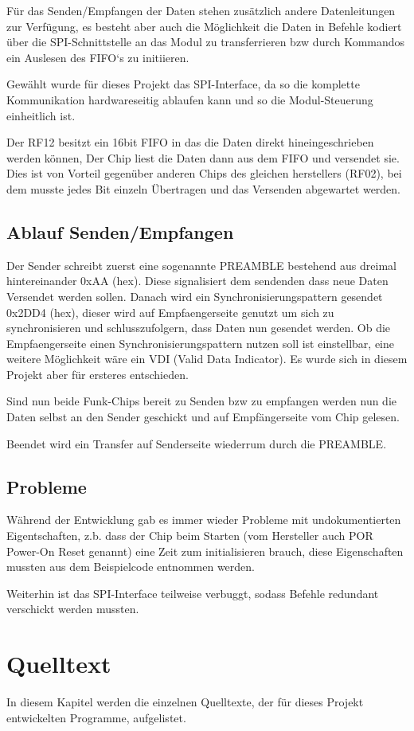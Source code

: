 \documentclass{scrartcl}
\begin{document}
		Für das Senden/Empfangen der Daten stehen zusätzlich andere Datenleitungen
		zur Verfügung, es besteht aber auch die Möglichkeit die Daten in Befehle
		kodiert über die SPI-Schnittstelle an das Modul zu transferrieren bzw
		durch Kommandos ein Auslesen des FIFO`s zu initiieren.

		Gewählt wurde für dieses Projekt das SPI-Interface, da so die komplette 
		Kommunikation hardwareseitig ablaufen kann und so die Modul-Steuerung einheitlich ist.

		Der RF12 besitzt ein 16bit FIFO in das die Daten direkt hineingeschrieben werden können,
		Der Chip liest die Daten dann aus dem FIFO und versendet sie.
		Dies ist von Vorteil gegenüber anderen Chips des gleichen herstellers (RF02), bei dem
		musste jedes Bit einzeln Übertragen und das Versenden abgewartet werden.

	\subsection{Ablauf Senden/Empfangen}
		Der Sender schreibt zuerst eine sogenannte PREAMBLE bestehend aus dreimal 
		hintereinander 0xAA (hex). Diese signalisiert dem sendenden dass neue Daten 
		Versendet werden sollen.
		Danach wird ein Synchronisierungspattern gesendet 0x2DD4 (hex), dieser wird
		auf Empfaengerseite genutzt um sich zu synchronisieren und schlusszufolgern,
		dass Daten nun gesendet werden. Ob die Empfaengerseite einen
		Synchronisierungspattern nutzen soll ist einstellbar, eine weitere Möglichkeit
		wäre ein VDI (Valid Data Indicator). Es wurde sich in diesem Projekt
		aber für ersteres entschieden.

		Sind nun beide Funk-Chips bereit zu Senden bzw zu empfangen werden nun die Daten
		selbst an den Sender geschickt und auf Empfängerseite vom Chip gelesen.

		Beendet wird ein Transfer auf Senderseite wiederrum durch die PREAMBLE.

	\subsection{Probleme}
		Während der Entwicklung gab es immer wieder Probleme mit undokumentierten Eigentschaften,
		z.b. dass der Chip beim Starten (vom Hersteller auch POR Power-On Reset genannt)
		eine Zeit zum initialisieren brauch, diese Eigenschaften mussten aus dem Beispielcode 
		entnommen werden.
		
		Weiterhin ist das SPI-Interface teilweise verbuggt, sodass Befehle redundant verschickt 
		werden mussten.
		

\newpage

\section{Quelltext} %
	In diesem Kapitel werden die einzelnen Quelltexte, der für dieses Projekt entwickelten Programme, aufgelistet.

\end{document}

